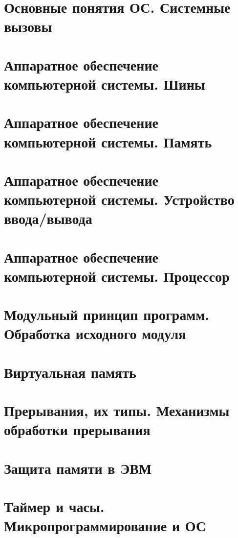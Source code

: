 \documentclass[a4paper, 10pt, notitlepage, pdftex,headsepline]{scrartcl}
\begin{document}
\section{Основные понятия ОС. Системные вызовы}
\section{Аппаратное обеспечение компьютерной системы. Шины}
\section{Аппаратное обеспечение компьютерной системы. Память}
\section{Аппаратное обеспечение компьютерной системы. Устройство ввода/вывода}
\section{Аппаратное обеспечение компьютерной системы. Процессор}
\section{Модульный принцип программ. Обработка исходного модуля}
\section{Виртуальная память}
\section{Прерывания, их типы. Механизмы обработки прерывания}
\section{Защита памяти в ЭВМ}
\section{Таймер и часы. Микропрограммирование и ОС}
\end{document}
